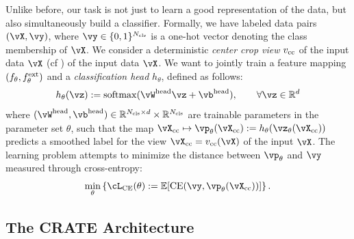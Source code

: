 \documentclass[../../book-main.tex]{subfiles}
\begin{document}
Unlike before, our task is not just to learn a good representation of the data, but also simultaneously build a classifier. Formally, we have labeled data pairs \((\vX, \vy)\), where \(\vy \in \{0, 1\}^{N_{\cls}}\) is a one-hot vector denoting the class membership of \(\vX\). We consider a deterministic \textit{center crop view} \(v_{\mathrm{cc}}\) of the input data \(\vX\) (cf ) of the input data \(\vX\). We want to jointly train a feature mapping \((f_{\theta}, f_{\theta}^{\mathrm{ext}})\) and a \textit{classification head} \(h_{\theta}\), defined as follows:
\begin{equation}
    h_{\theta}(\vz) := \softmax(\vW^{\head}\vz + \vb^{\head}), \qquad  \forall \vz \in \R^{d}
\end{equation}
where \((\vW^{\head}, \vb^{\head}) \in \R^{N_{\cls} \times d} \times \R^{N_{\cls}}\) are trainable parameters in the parameter set \(\theta\), such that the map \(\vX_{\cc} \mapsto \vp_{\theta}(\vX_{\cc}) := h_{\theta}(\vz_{\theta}(\vX_{\cc}))\) predicts a smoothed label for the view \(\vX_{\cc} = v_{\cc}(\vX)\) of the input \(\vX\). The learning problem attempts to minimize the distance between \(\vp_{\theta}\) and \(\vy\) measured through cross-entropy:
\begin{equation}\label{eq:classification_ce_loss}
    \min_{\theta}\bc{\cL_{\CE}(\theta) := \Ex[\CE(\vy, \vp_{\theta}(\vX_{\cc}))]}.
\end{equation}


\subsection{The CRATE Architecture}\label{sub:image_classification_architecture}
\end{document}
